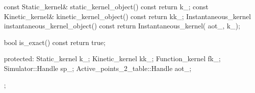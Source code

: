 \begin{ccExampleCode}
{  const Static_kernel& static_kernel_object() const {return k_;}
  const Kinetic_kernel& kinetic_kernel_object() const {return kk_;}
  Instantaneous_kernel instantaneous_kernel_object() const {return Instantaneous_kernel( aot_, k_);}

  bool is_exact() const {
    return true;
  }


protected:
  Static_kernel k_;
  Kinetic_kernel kk_;
  Function_kernel fk_;
  Simulator::Handle sp_;
  Active_points_2_table::Handle aot_;
};


\end{ccExampleCode}


